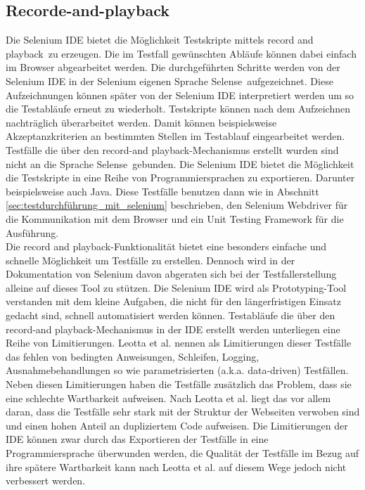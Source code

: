 \subsection{Recorde-and-playback}
\label{sec:recorde_and_playback}
Die Selenium IDE bietet die Möglichkeit Testskripte mittels \grq record and playback\grq\ zu erzeugen.
Die im Testfall gewünschten Abläufe können dabei einfach im Browser abgearbeitet werden.
Die durchgeführten Schritte werden von der Selenium IDE in der Selenium eigenen Sprache \grq Selense\grq\ aufgezeichnet. Diese Aufzeichnungen können später von der Selenium IDE interpretiert werden um so die Testabläufe erneut zu wiederholt.
Testskripte können nach dem Aufzeichnen nachträglich überarbeitet werden. Damit können beispielsweise Akzeptanzkriterien an bestimmten Stellen im Testablauf eingearbeitet werden.\\
Testfälle die über den \grq record-and playback\grq -Mechanismus erstellt wurden sind nicht an die Sprache \grq Selense\grq\ gebunden. Die Selenium IDE bietet die Möglichkeit die Testskripte in eine Reihe von Programmiersprachen zu exportieren. Darunter beispielsweise auch Java.
Diese Testfälle benutzen dann wie in Abschnitt \ref{sec:testdurchführung_mit_selenium} beschrieben, den Selenium Webdriver für die Kommunikation mit dem Browser und ein Unit Testing Framework für die Ausführung.\\
Die \grq record and playback\grq -Funktionalität bietet eine besonders einfache und schnelle Möglichkeit um Testfälle zu erstellen. Dennoch wird in der Dokumentation von Selenium \cite{selenium_selenium_2015-1} davon abgeraten sich bei der Testfallerstellung alleine auf dieses Tool zu stützen. Die Selenium IDE wird als Prototyping-Tool verstanden mit dem kleine Aufgaben, die nicht für den längerfristigen Einsatz gedacht sind, schnell automatisiert werden können.
Testabläufe die über den \grq record-and playback\grq -Mechanismus in der IDE erstellt werden unterliegen eine Reihe von Limitierungen. Leotta et al. \cite{leotta_repairing_2013} nennen als Limitierungen dieser Testfälle das fehlen von bedingten Anweisungen, Schleifen, Logging, Ausnahmebehandlungen so wie parametrisierten (a.k.a. data-driven) Testfällen.
Neben diesen Limitierungen haben die Testfälle zusätzlich das Problem, dass sie eine schlechte Wartbarkeit aufweisen. Nach Leotta et al. \cite{leotta_repairing_2013} liegt das vor allem daran, dass die Testfälle sehr stark mit der Struktur der Webseiten verwoben sind und einen hohen Anteil an dupliziertem Code aufweisen.
Die Limitierungen der IDE können zwar durch das Exportieren der Testfälle in eine Programmiersprache überwunden werden, die Qualität der Testfälle im Bezug auf ihre spätere Wartbarkeit kann nach  Leotta et al. \cite{leotta_repairing_2013} auf diesem Wege jedoch nicht verbessert werden.\\
